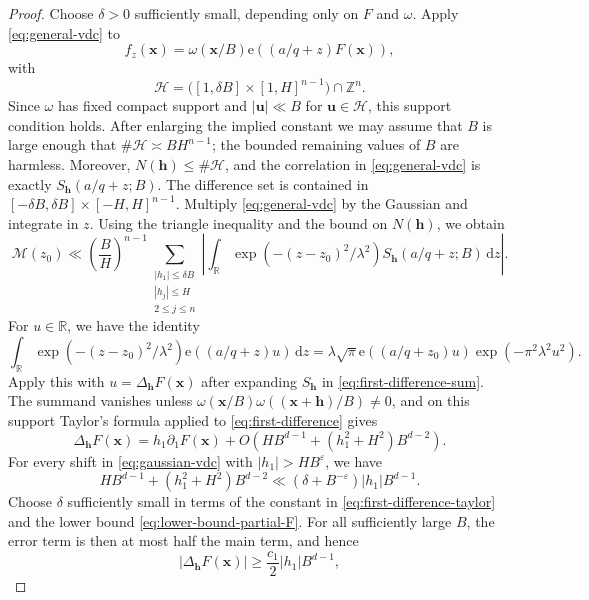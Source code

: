 \documentclass[reqno,a4paper,11pt]{amsart}
\numberwithin{equation}{section}
\newcommand{\ZZ}{\mathbb Z}
\newcommand{\RR}{\mathbb R}
\newcommand{\x}{\mathbf{x}}
\newcommand{\h}{\mathbf h}
\newcommand{\e}{\mathrm e}
\newcommand{\eps}{\varepsilon}
\newcommand{\dint}{\,\mathrm d}
\theoremstyle{plain}
\theoremstyle{definition}
\begin{document}
\begin{proof}
Choose \(\delta>0\) sufficiently small, depending only on \(F\) and \(\omega\).
Apply \eqref{eq:general-vdc} to
\[
 f_z(\x)=\omega(\x/B)\e((a/q+z)F(\x)),
\]
with
\[
\mathcal H=
 \bigl([1,\delta B]\times[1,H]^{n-1}\bigr)\cap\ZZ^n.
\]
Since \(\omega\) has fixed compact support and \(|\mathbf u|\ll B\) for \(\mathbf u\in\mathcal H\), this support condition holds.
After enlarging the implied constant we may assume that \(B\) is large enough that \(\#\mathcal H\asymp BH^{n-1}\); the bounded remaining values of \(B\) are harmless.
Moreover, \(N(\h)\leq\#\mathcal H\), and the correlation in \eqref{eq:general-vdc} is exactly \(S_\h(a/q+z;B)\).
The difference set is contained in \([ -\delta B,\delta B]\times[-H,H]^{n-1}\).
Multiply \eqref{eq:general-vdc} by the Gaussian and integrate in \(z\).
Using the triangle inequality and the bound on \(N(\h)\), we obtain
\begin{equation}\label{eq:gaussian-vdc}
 \mathcal M(z_0)\ll
 \left(\frac BH\right)^{n-1}\!
 \sum_{\substack{|h_1|\leq\delta B\\
                  |h_j|\leq H\\
                  2\leq j\leq n}}
 \left|\int_{\RR}\exp(-(z-z_0)^2/\lambda^2)
 S_{\h}(a/q+z;B)\dint z\right|.
\end{equation}
For \(u\in\RR\), we have the identity
\begin{equation*}
 \int_{\RR}\exp(-(z-z_0)^2/\lambda^2)
 \e((a/q+z)u)\dint z
 =\lambda\sqrt\pi
 \e((a/q+z_0)u)
 \exp(-\pi^2\lambda^2u^2).
\end{equation*}
Apply this with \(u=\Delta_\h F(\x)\) after expanding \(S_{\h}\) in \eqref{eq:first-difference-sum}.
The summand vanishes unless \(\omega(\x/B)\omega((\x+\h)/B)\neq0\), and on this support Taylor's formula applied to \eqref{eq:first-difference} gives
\begin{equation}\label{eq:first-difference-taylor}
 \Delta_\h F(\x)
 =h_1\partial_1F(\x)+O(HB^{d-1} + (h_1^2+H^2)B^{d-2}).
\end{equation}
For every shift in \eqref{eq:gaussian-vdc} with \(|h_1|>HB^\eps\), we have
\begin{equation*}
 HB^{d-1}+(h_1^2+H^2)B^{d-2}
 \ll(\delta+B^{-\eps})|h_1|B^{d-1}.
\end{equation*}
Choose \(\delta\) sufficiently small in terms of the constant in \eqref{eq:first-difference-taylor} and the lower bound \eqref{eq:lower-bound-partial-F}.
For all sufficiently large \(B\), the error term is then at most half the main term, and hence
\[
 |\Delta_\h F(\x)|\geq \frac{c_1}{2}|h_1|B^{d-1},
\]
\end{proof}
\end{document}
